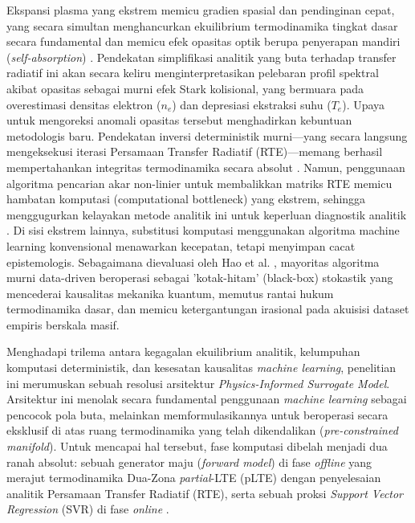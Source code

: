 \documentclass[10pt,leqno]{amsart}
\begin{document}
Ekspansi plasma yang ekstrem memicu gradien spasial dan pendinginan cepat, yang secara simultan menghancurkan ekuilibrium termodinamika tingkat dasar secara fundamental \cite{zaytsev_accurate_2026} dan memicu efek opasitas optik berupa penyerapan mandiri (\textit{self-absorption}) \cite{hansen_modeling_2021}. Pendekatan simplifikasi analitik yang buta terhadap transfer radiatif ini akan secara keliru menginterpretasikan pelebaran profil spektral akibat opasitas sebagai murni efek Stark kolisional, yang bermuara pada overestimasi densitas elektron ($n_e$) dan depresiasi ekstraksi suhu ($T_e$). Upaya untuk mengoreksi anomali opasitas tersebut menghadirkan kebuntuan metodologis baru. Pendekatan inversi deterministik murni—yang secara langsung mengeksekusi iterasi Persamaan Transfer Radiatif (RTE)—memang berhasil mempertahankan integritas termodinamika secara absolut \cite{favre_merlin_2025}. Namun, penggunaan algoritma pencarian akar non-linier untuk membalikkan matriks RTE memicu hambatan komputasi (computational bottleneck) yang ekstrem, sehingga menggugurkan kelayakan metode analitik ini untuk keperluan diagnostik analitik \cite{favre_towards_2025}. Di sisi ekstrem lainnya, substitusi komputasi menggunakan algoritma machine learning konvensional menawarkan kecepatan, tetapi menyimpan cacat epistemologis. Sebagaimana dievaluasi oleh Hao et al. \cite{hao_machine_2024}, mayoritas algoritma murni data-driven beroperasi sebagai 'kotak-hitam' (black-box) stokastik yang mencederai kausalitas mekanika kuantum, memutus rantai hukum termodinamika dasar, dan memicu ketergantungan irasional pada akuisisi dataset empiris berskala masif.

Menghadapi trilema antara kegagalan ekuilibrium analitik, kelumpuhan komputasi deterministik, dan kesesatan kausalitas \textit{machine learning}, penelitian ini merumuskan sebuah resolusi arsitektur \textit{Physics-Informed Surrogate Model}. Arsitektur ini menolak secara fundamental penggunaan \textit{machine learning} sebagai pencocok pola buta, melainkan memformulasikannya untuk beroperasi secara eksklusif di atas ruang termodinamika yang telah dikendalikan (\textit{pre-constrained manifold}). Untuk mencapai hal tersebut, fase komputasi dibelah menjadi dua ranah absolut: sebuah generator maju (\textit{forward model}) di fase \textit{offline} yang merajut termodinamika Dua-Zona \textit{partial}-LTE (pLTE) \cite{zaitsev_two-zone_2024} dengan penyelesaian analitik Persamaan Transfer Radiatif (RTE), serta sebuah proksi \textit{Support Vector Regression} (SVR) di fase \textit{online} \cite{wu_novel_2025}.
\end{document}
